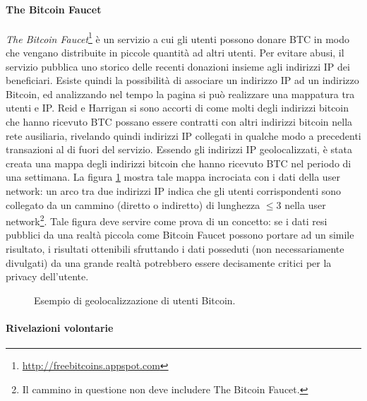 \paragraph{The Bitcoin Faucet}

\emph{The Bitcoin Faucet}\footnote{\url{http://freebitcoins.appspot.com}} è un servizio a cui gli utenti possono donare BTC in modo che vengano distribuite in piccole quantità ad altri utenti. Per evitare abusi, il servizio pubblica uno storico delle recenti donazioni insieme agli indirizzi IP dei beneficiari. Esiste quindi la possibilità di associare un indirizzo IP ad un indirizzo Bitcoin, ed analizzando nel tempo la pagina si può realizzare una mappatura tra utenti e IP.
Reid e Harrigan si sono accorti di come molti degli indirizzi bitcoin che hanno ricevuto BTC possano essere contratti con altri indirizzi bitcoin nella rete ausiliaria, rivelando quindi indirizzi IP collegati in qualche modo a precedenti transazioni al di fuori del servizio.
Essendo gli indirizzi IP geolocalizzati, è stata creata una mappa degli indirizzi bitcoin che hanno ricevuto BTC nel periodo di una settimana. La figura \ref{anonimato_pag_16} mostra tale mappa incrociata con i dati della user network: un arco tra due indirizzi IP indica che gli utenti corrispondenti sono collegato da un cammino (diretto o indiretto) di lunghezza $\leq 3$ nella user network\footnote{Il cammino in questione non deve includere The Bitcoin Faucet.}. Tale figura deve servire come prova di un concetto: se i dati resi pubblici da una realtà piccola come Bitcoin Faucet possono portare ad un simile risultato, i risultati ottenibili sfruttando i dati posseduti (non necessariamente divulgati) da una grande realtà potrebbero essere decisamente critici per la privacy dell'utente.


\begin{figure}[htbp]
  \centering
  \hfill
  \caption{Esempio di geolocalizzazione di utenti Bitcoin.\label{anonimato_pag_16}}
\end{figure}

\paragraph{Rivelazioni volontarie}

